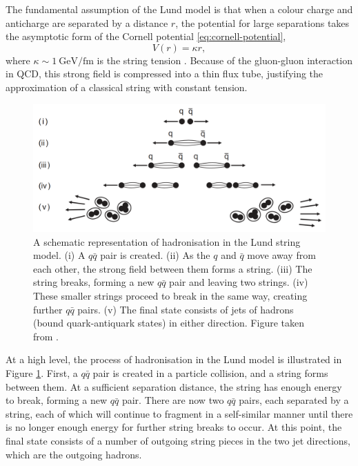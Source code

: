\documentclass[12pt,a4paper]{report}
\begin{document}
The fundamental assumption of the Lund model is that when a colour charge and anticharge are separated by a distance $r$, the potential for large separations takes the asymptotic form of the Cornell potential \eqref{eq:cornell-potential},
\begin{equation}
  V(r) = \kappa r,
\end{equation}
where $\kappa \sim \qty{1}{\giga\electronvolt\per\femto\meter}$ is the string tension \cite{Bali:1992ab}. Because of the gluon-gluon interaction in QCD, this strong field is compressed into a thin flux tube, justifying the approximation of a classical string with constant tension.

\begin{figure}
  \centering
  \includegraphics[width=0.8\linewidth]{figures/lund-hadronisation.png}
  \caption{A schematic representation of hadronisation in the Lund string model. (i) A $q\bar{q}$ pair is created. (ii) As the $q$ and $\bar{q}$ move away from each other, the strong field between them forms a string. (iii) The string breaks, forming a new $q\bar{q}$ pair and leaving two strings. (iv) These smaller strings proceed to break in the same way, creating further $q\bar{q}$ pairs. (v) The final state consists of jets of hadrons (bound quark-antiquark states) in either direction. Figure taken from \cite{Thomson:2013zua}.}
  \label{fig:lund-hadronisation}
\end{figure}

At a high level, the process of hadronisation in the Lund model is illustrated in Figure \ref{fig:lund-hadronisation}. First, a $q\bar{q}$ pair is created in a particle collision, and a string forms between them. At a sufficient separation distance, the string has enough energy to break, forming a new $q\bar{q}$ pair. There are now two $q\bar{q}$ pairs, each separated by a string, each of which will continue to fragment in a self-similar manner until there is no longer enough energy for further string breaks to occur. At this point, the final state consists of a number of outgoing string pieces in the two jet directions, which are the outgoing hadrons.
\end{document}
